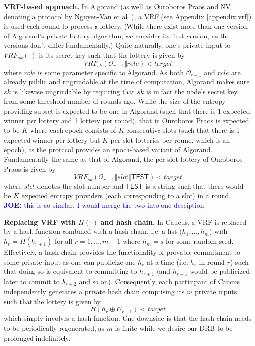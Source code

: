 \documentclass[letterpaper,twocolumn,10pt]{article}
\theoremstyle{definition}
\theoremstyle{remark}
\newcommand{\joenote}[1]{\textcolor{blue}{\textbf{JOE:} #1}}
\begin{document}
\noindent\textbf{VRF-based approach.} In Algorand \cite{gilad2017algorand} (as well as Ouroboros Praos \cite{david2018ouroboros} and NV denoting a protocol by Nguyen-Van et al. \cite{nguyen2019scalable}), a VRF (see Appendix \ref{appendix:vrf}) is used each round to process a lottery. (While there exist more than one version of Algorand's private lottery algorithm, we consider its first version, as the versions don't differ fundamentally.) Quite naturally, one's private input to $VRF_{sk}(\cdot)$ is its secret key such that the lottery is given by
\[
VRF_{sk}(\mathcal{O}_{r - 1} \mathbin\Vert role) < target
\]
where $role$ is some parameter specific to Algorand. As both $\mathcal{O}_{r - 1}$ and $role$ are already public and ungrindable at the time of computation, Algorand makes sure $sk$ is likewise ungrindable by requiring that $sk$ is in fact the node's secret key from some threshold number of rounds ago. While the size of the entropy-providing subset is expected to be one in Algorand (such that there is 1 expected winner per lottery and 1 lottery per round), that in Ouroboros Praos is expected to be $K$ where each epoch consists of $K$ consecutive slots (such that there is 1 expected winner per lottery but $K$ per-slot lotteries per round, which is an epoch), as the protocol provides an epoch-based variant of Algorand. Fundamentally the same as that of Algorand, the per-slot lottery of Ouroboros Praos is given by
\[
VRF_{sk}(\mathcal{O}_{r - 1} \mathbin\Vert slot \mathbin\Vert \mathsf{TEST}) < target
\]
where $slot$ denotes the slot number and $\mathsf{TEST}$ is a string such that there would be $K$ expected entropy providers (each corresponding to a slot) in a round.\\\joenote{this is so similar, I would merge the two into one desciption}

\noindent\textbf{Replacing VRF with $H(\cdot)$ and hash chain.} In Caucus, a VRF is replaced by a hash function combined with a hash chain, i.e. a list ($h_1, ..., h_m$) with $h_r = H(h_{r + 1})$ for all $r = 1, ..., m - 1$ where $h_m = s$ for some random seed. Effectively, a hash chain provides the functionality of provable commitment to some private input as one can publicize one $h_r$ at a time (i.e. $h_r$ in round $r$) such that doing so is equivalent to committing to $h_{r + 1}$ (and $h_{r + 1}$ would be publicized later to commit to $h_{r + 2}$ and so on). Consequently, each participant of Caucus independently generates a private hash chain comprising its $m$ private inputs such that the lottery is given by
\[
H(h_r \oplus \mathcal{O}_{r - 1}) < target
\]
which simply involves a hash function. One downside is that the hash chain needs to be periodically regenerated, as $m$ is finite while we desire our DRB to be prolonged indefinitely.
\end{document}
